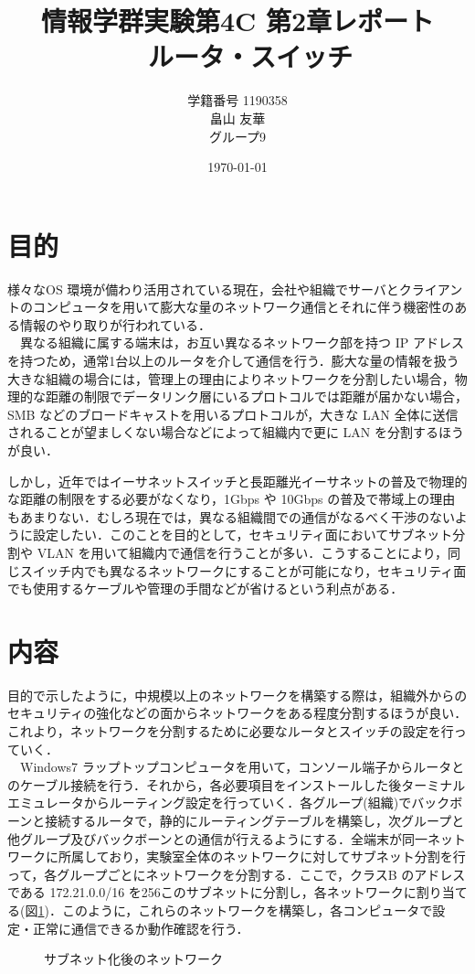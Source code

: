 \documentclass[a4j,titlepage]{jarticle}
\title{情報学群実験第4C 第2章レポート\\　ルータ・スイッチ}
\author{学籍番号 1190358\\
        畠山 友華\\
        グループ9}
\date{\today}
\begin{document}
\maketitle

\section{目的}
様々なOS 環境が備わり活用されている現在，会社や組織でサーバとクライアントのコンピュータを用いて膨大な量のネットワーク通信とそれに伴う機密性のある情報のやり取りが行われている．\\
　異なる組織に属する端末は，お互い異なるネットワーク部を持つ IP アドレスを持つため，通常1台以上のルータを介して通信を行う．膨大な量の情報を扱う大きな組織の場合には，管理上の理由によりネットワークを分割したい場合，物理的な距離の制限でデータリンク層にいるプロトコルでは距離が届かない場合，SMB などのブロードキャストを用いるプロトコルが，大きな LAN 全体に送信されることが望ましくない場合などによって組織内で更に LAN を分割するほうが良い．

しかし，近年ではイーサネットスイッチと長距離光イーサネットの普及で物理的な距離の制限をする必要がなくなり，1Gbps や 10Gbps の普及で帯域上の理由もあまりない．むしろ現在では，異なる組織間での通信がなるべく干渉のないように設定したい．このことを目的として，セキュリティ面においてサブネット分割や VLAN を用いて組織内で通信を行うことが多い．こうすることにより，同じスイッチ内でも異なるネットワークにすることが可能になり，セキュリティ面でも使用するケーブルや管理の手間などが省けるという利点がある．

\section{内容}
目的で示したように，中規模以上のネットワークを構築する際は，組織外からのセキュリティの強化などの面からネットワークをある程度分割するほうが良い．これより，ネットワークを分割するために必要なルータとスイッチの設定を行っていく．\\
　Windows7 ラップトップコンピュータを用いて，コンソール端子からルータとのケーブル接続を行う．それから，各必要項目をインストールした後ターミナルエミュレータからルーティング設定を行っていく．各グループ(組織)でバックボーンと接続するルータで，静的にルーティングテーブルを構築し，次グループと他グループ及びバックボーンとの通信が行えるようにする．全端末が同一ネットワークに所属しており，実験室全体のネットワークに対してサブネット分割を行って，各グループごとにネットワークを分割する．ここで，クラスB のアドレスである 172.21.0.0/16 を256このサブネットに分割し，各ネットワークに割り当てる(図\ref{fig:subnet})．このように，これらのネットワークを構築し，各コンピュータで設定・正常に通信できるか動作確認を行う．
　
  \begin{figure}[htbp]
    \begin{center}
      \caption{サブネット化後のネットワーク}
     \label{fig:subnet}
   \end{center}
  \end{figure}
\end{document}

